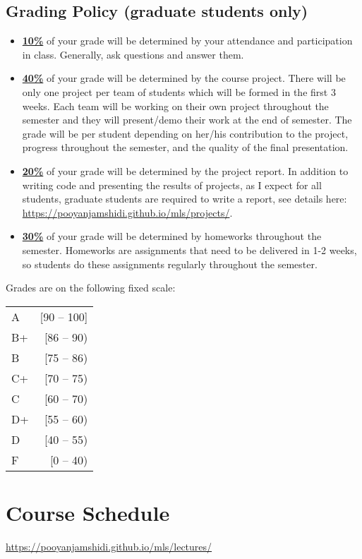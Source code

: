 \documentclass[11pt]{article}
\begin{document}
\subsection*{Grading Policy (graduate students only)}

\begin{itemize}
  \item \underline{\textbf{10\%}} of your grade will be determined by your attendance and participation in class. Generally, ask questions and answer them.

  \item \underline{\textbf{40\%}} of your grade will be determined by the course project. There will be only one project per team of students which will be formed in the first 3 weeks. Each team will be working on their own project throughout the semester and they will present/demo their work at the end of semester. The grade will be per student depending on her/his contribution to the project, progress throughout the semester, and the quality of the final presentation.

  \item \underline{\textbf{20\%}} of your grade will be determined by the project report. In addition to writing code and presenting the results of projects, as I expect for all students, graduate students are required to write a report, see details here: \url{https://pooyanjamshidi.github.io/mls/projects/}. 

  \item \underline{\textbf{30\%}} of your grade will be determined by homeworks throughout the semester. Homeworks are assignments that need to be delivered in 1-2 weeks, so students do these assignments regularly throughout the semester.


\end{itemize}


Grades are on the following fixed scale:

\begin{tabular}{lr}
A & [90 -- 100] \\
B+ &  [86 -- 90) \\
B & [75 -- 86)\\
C+  & [70 -- 75)\\
C&  [60 -- 70)\\
D+ &  [55 -- 60)\\
D & [40 -- 55)\\
F & [0 -- 40)\\

\end{tabular}




\section*{Course Schedule}
\url{https://pooyanjamshidi.github.io/mls/lectures/}
\end{document}
